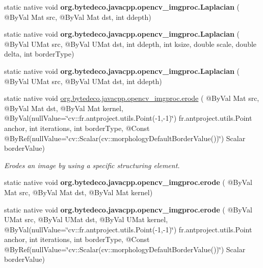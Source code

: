 \begin{DoxyCompactItemize}
static native void {\bfseries org.\+bytedeco.\+javacpp.\+opencv\+\_\+imgproc.\+Laplacian} ( @By\+Val Mat src, @By\+Val Mat dst, int ddepth)
\item 
\mbox{\label{group__imgproc__filter_ga53a73c7ebe19e765d5a5c3ddd0021e93}} 
static native void {\bfseries org.\+bytedeco.\+javacpp.\+opencv\+\_\+imgproc.\+Laplacian} ( @By\+Val U\+Mat src, @By\+Val U\+Mat dst, int ddepth, int ksize, double scale, double delta, int border\+Type)
\item 
\mbox{\label{group__imgproc__filter_gaef7e4f2a12bc667667e94f5706fc7576}} 
static native void {\bfseries org.\+bytedeco.\+javacpp.\+opencv\+\_\+imgproc.\+Laplacian} ( @By\+Val U\+Mat src, @By\+Val U\+Mat dst, int ddepth)
\item 
static native void \hyperlink{group__imgproc__filter_ga8c0cbcc8dd271aada560698924d19cb2}{org.\+bytedeco.\+javacpp.\+opencv\+\_\+imgproc.\+erode} ( @By\+Val Mat src, @By\+Val Mat dst, @By\+Val Mat kernel, @By\+Val(null\+Value=\char`\"{}cv\+::\+fr.antproject.utils.Point(-\/1,-\/1)\char`\"{}) fr.antproject.utils.Point anchor, int iterations, int border\+Type, @Const @By\+Ref(null\+Value=\char`\"{}cv\+::\+Scalar(cv\+::morphology\+Default\+Border\+Value())\char`\"{}) Scalar border\+Value)
\begin{DoxyCompactList}\small\item\em Erodes an image by using a specific structuring element. \end{DoxyCompactList}\item 
\mbox{\label{group__imgproc__filter_ga650836745d55fe30014d0893f9bc7571}} 
static native void {\bfseries org.\+bytedeco.\+javacpp.\+opencv\+\_\+imgproc.\+erode} ( @By\+Val Mat src, @By\+Val Mat dst, @By\+Val Mat kernel)
\item 
\mbox{\label{group__imgproc__filter_ga49298d4b54f3535b97b7b03ed29c978a}} 
static native void {\bfseries org.\+bytedeco.\+javacpp.\+opencv\+\_\+imgproc.\+erode} ( @By\+Val U\+Mat src, @By\+Val U\+Mat dst, @By\+Val U\+Mat kernel, @By\+Val(null\+Value=\char`\"{}cv\+::\+fr.antproject.utils.Point(-\/1,-\/1)\char`\"{}) fr.antproject.utils.Point anchor, int iterations, int border\+Type, @Const @By\+Ref(null\+Value=\char`\"{}cv\+::\+Scalar(cv\+::morphology\+Default\+Border\+Value())\char`\"{}) Scalar border\+Value)

\end{DoxyCompactItemize}
